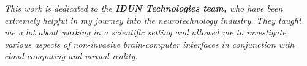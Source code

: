 \begin{dedication}

    \textit{This work is dedicated to the \textbf{IDUN Technologies team,} who have been extremely helpful in my journey into the neurotechnology industry. They taught me a lot about working in a scientific setting and allowed me to investigate various aspects of non-invasive brain-computer interfaces in conjunction with cloud computing and virtual reality.}



\end{dedication}

